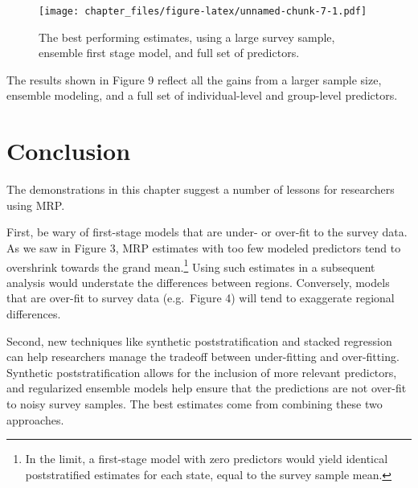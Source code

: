 \documentclass[
]{article}
\newenvironment{Shaded}{\begin{snugshade}}{\end{snugshade}}
\newcommand{\AttributeTok}[1]{\textcolor[rgb]{0.77,0.63,0.00}{#1}}
\newcommand{\CommentTok}[1]{\textcolor[rgb]{0.56,0.35,0.01}{\textit{#1}}}
\newcommand{\FunctionTok}[1]{\textcolor[rgb]{0.00,0.00,0.00}{#1}}
\newcommand{\NormalTok}[1]{#1}
\newcommand{\OtherTok}[1]{\textcolor[rgb]{0.56,0.35,0.01}{#1}}
\newcommand{\SpecialCharTok}[1]{\textcolor[rgb]{0.00,0.00,0.00}{#1}}
\begin{document}
\begin{Shaded}
\end{Shaded}

\begin{figure}
\centering
\texttt{[image: chapter\_files/figure-latex/unnamed-chunk-7-1.pdf]}
\caption{The best performing estimates, using a large survey sample,
ensemble first stage model, and full set of predictors.}
\end{figure}

The results shown in Figure 9 reflect all the gains from a larger sample
size, ensemble modeling, and a full set of individual-level and
group-level predictors.

\hypertarget{conclusion}{%
\section{Conclusion}\label{conclusion}}

The demonstrations in this chapter suggest a number of lessons for
researchers using MRP.

First, be wary of first-stage models that are under- or over-fit to the
survey data. As we saw in Figure 3, MRP estimates with too few modeled
predictors tend to overshrink towards the grand mean.\footnote{In the
  limit, a first-stage model with zero predictors would yield identical
  poststratified estimates for each state, equal to the survey sample
  mean.} Using such estimates in a subsequent analysis would understate
the differences between regions. Conversely, models that are over-fit to
survey data (e.g.~Figure 4) will tend to exaggerate regional
differences.

Second, new techniques like synthetic poststratification and stacked
regression can help researchers manage the tradeoff between
under-fitting and over-fitting. Synthetic poststratification allows for
the inclusion of more relevant predictors, and regularized ensemble
models help ensure that the predictions are not over-fit to noisy survey
samples. The best estimates come from combining these two approaches.
\end{document}
